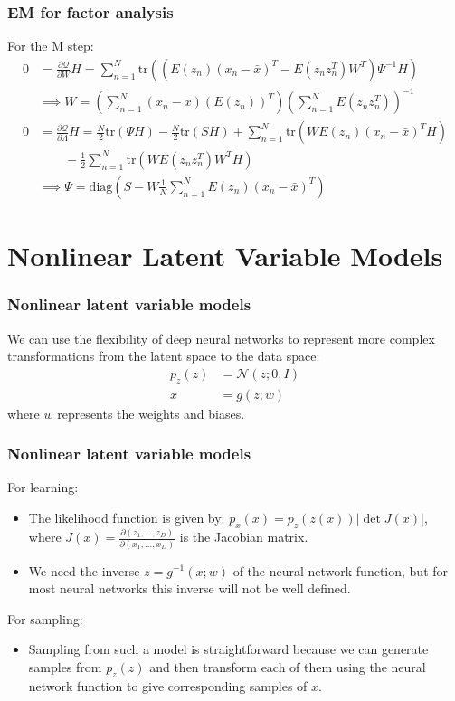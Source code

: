 \documentclass{beamer}
\begin{document}
\begin{frame}
    \frametitle{EM for factor analysis}
    For the M step:
    \begin{align*}
        0&=\frac{\partial\mathcal{Q}}{\partial{}W}H=\sum_{n=1}^{N}\mathrm{tr}((E(z_{n})(x_{n}-\bar{x})^{T}-E(z_{n}z_{n}^{T})W^{T})\Psi^{-1}H) \\
        &\implies{}W=(\sum_{n=1}^{N}(x_{n}-\bar{x})(E(z_{n}))^{T})(\sum_{n=1}^{N}E(z_{n}z_{n}^{T}))^{-1} \\
        0&=\frac{\partial\mathcal{Q}}{\partial\Lambda}H=\frac{N}{2}\mathrm{tr}(\Psi{}H)-\frac{N}{2}\mathrm{tr}(SH)+\sum_{n=1}^{N}\mathrm{tr}(WE(z_{n})(x_{n}-\bar{x})^{T}H) \\
        &\qquad-\frac{1}{2}\sum_{n=1}^{N}\mathrm{tr}(WE(z_{n}z_{n}^{T})W^{T}H) \\
        &\implies\Psi=\mathrm{diag}(S-W\frac{1}{N}\sum_{n=1}^{N}E(z_{n})(x_{n}-\bar{x})^{T})
    \end{align*}
\end{frame}

\section{Nonlinear Latent Variable Models}

\begin{frame}
    \frametitle{Nonlinear latent variable models}
    We can use the flexibility of deep neural networks to represent more complex transformations from the latent space to the data space:
    \begin{align*}
        p_{z}(z)&=\mathcal{N}(z;0,I) \\
        x&=g(z;w)
    \end{align*}
    where $w$ represents the weights and biases.
\end{frame}

\begin{frame}
    \frametitle{Nonlinear latent variable models}
    For learning:
    \begin{itemize}
        \item The likelihood function is given by: $p_{x}(x)=p_{z}(z(x))|\det{}J(x)|$, where $J(x)=\frac{\partial(z_{1},\hdots,z_{D})}{\partial(x_{1},\hdots,x_{D})}$ is the Jacobian matrix.
        \item We need the inverse $z=g^{-1}(x;w)$ of the neural network function, but for most neural networks this inverse will not be well defined.
    \end{itemize}
    For sampling:
    \begin{itemize}
        \item Sampling from such a model is straightforward because we can generate samples from $p_{z}(z)$ and then transform each of them using the neural network function to give corresponding samples of $x$.
    \end{itemize}
\end{frame}
\end{document}
